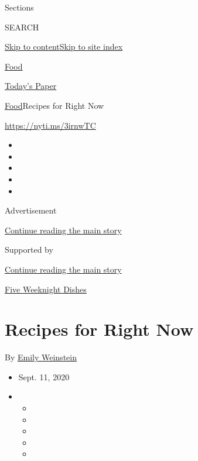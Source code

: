 Sections

SEARCH

\protect\hyperlink{site-content}{Skip to
content}\protect\hyperlink{site-index}{Skip to site index}

\href{https://www.nytimes3xbfgragh.onion/section/food}{Food}

\href{https://myaccount.nytimes3xbfgragh.onion/auth/login?response_type=cookie\&client_id=vi}{}

\href{https://www.nytimes3xbfgragh.onion/section/todayspaper}{Today's
Paper}

\href{/section/food}{Food}\textbar{}Recipes for Right Now

\url{https://nyti.ms/3irnwTC}

\begin{itemize}
\item
\item
\item
\item
\item
\end{itemize}

Advertisement

\protect\hyperlink{after-top}{Continue reading the main story}

Supported by

\protect\hyperlink{after-sponsor}{Continue reading the main story}

\href{/column/five-weeknight-dishes}{Five Weeknight Dishes}

\hypertarget{recipes-for-right-now}{%
\section{Recipes for Right Now}\label{recipes-for-right-now}}

By \href{https://www.nytimes3xbfgragh.onion/by/emily-weinstein}{Emily
Weinstein}

\begin{itemize}
\item
  Sept. 11, 2020
\item
  \begin{itemize}
  \item
  \item
  \item
  \item
  \item
  \end{itemize}
\end{itemize}

